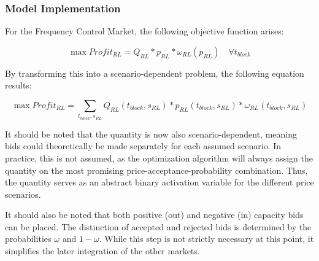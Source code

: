 \subsubsection{Model Implementation}
For the Frequency Control Market, the following objective function arises:

\begin{equation}
	\max Profit_{RL} = Q_{RL} * p_{RL} * \omega_{RL}(p_{RL}) \quad \forall t_{block}
\end{equation}

By transforming this into a scenario-dependent problem, the following equation results:

\begin{equation}
	\max Profit_{RL} = \sum_{t_{block}, s_{RL}} Q_{RL}(t_{block}, s_{RL}) * p_{RL}(t_{block}, s_{RL}) * \omega_{RL}(t_{block}, s_{RL})
\end{equation}


It should be noted that the quantity is now also scenario-dependent, meaning bids could theoretically be made separately for each assumed scenario.
In practice, this is not assumed, as the optimization algorithm will always assign the quantity on the most promising price-acceptance-probability combination.
Thus, the quantity serves as an abstract binary activation variable for the different price scenarios.


It should also be noted that both positive (out) and negative (in) capacity bids can be placed.
The distinction of accepted and rejected bids is determined by the probabilities $\omega$ and $1-\omega$.
While this step is not strictly necessary at this point, it simplifies the later integration of the other markets.

